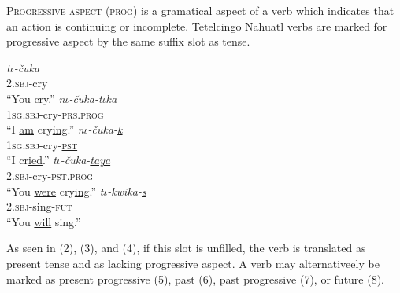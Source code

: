 \documentclass[doc,12pt]{apa6}
\begin{document}
\textsc{Progressive aspect} (\textsc{prog}) is a gramatical aspect of a verb which
indicates that an action is continuing or incomplete. Tetelcingo Nahuatl verbs
are marked for progressive aspect by the same suffix slot as tense.

\begin{exe}
	\ex 
	\gll \textit{t$\iota$-\v{c}uka} \\
	\textsc{2.sbj}-cry \\
	\trans ``You cry.''
	\ex 
	\gll \textit{n$\iota$-\v{c}uka-\underline{t$\iota$ka}} \\
	\textsc{1sg.sbj}-cry-\textsc{prs.prog} \\
	\trans ``I \underline{am} cry\underline{ing}.''
	\ex 
	\gll \textit{n$\iota$-\v{c}uka-\underline{k}} \\
	\textsc{1sg.sbj}-cry-\underline{\textsc{pst}} \\
	\trans ``I cr\underline{ied}.''
	\ex 
	\gll \textit{t$\iota$-\v{c}uka-\underline{taya}} \\
	\textsc{2.sbj}-cry-\textsc{pst.prog} \\
	\trans ``You \underline{were} cry\underline{ing}.''
	\ex 
	\gll \textit{t$\iota$-kwika-\underline{s}} \\
	\textsc{2.sbj}-sing-\textsc{fut} \\
	\trans ``You \underline{will} sing.''
\end{exe}

As seen in (2), (3), and (4), if this slot is unfilled, the verb is translated
as present tense and as lacking progressive aspect. A verb may alternativeely
be marked as present progressive (5), past (6), past progressive (7), or future
(8).
\end{document}
